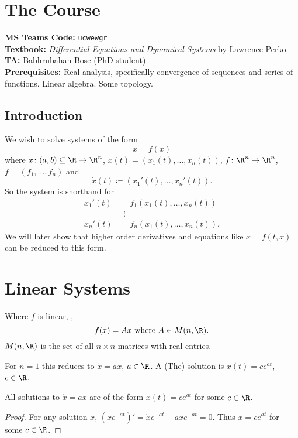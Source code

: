 
\setcounter{section}{-1}
\section{The Course} \label{sec:course}
\textbf{MS Teams Code:} \texttt{ucwewgr}\\
\textbf{Textbook:} \textit{Differential Equations and Dynamical Systems}
by Lawrence Perko.\\
\textbf{TA:} Babhrubahan Bose (PhD student)\\
\textbf{Prerequisites:} Real analysis, specifically convergence of sequences and
series of functions.
Linear algebra.
Some topology.

\subsection{Introduction} \label{sec:introduction}
We wish to solve systems of the form \[
    \dot{x} = f(x)
\] where $x \colon (a, b) \subseteq \R \to \R^n$, $x(t) = (x_1(t), \dots, x_n(t))$,
$f \colon \R^n \to \R^n$, $f = (f_1, \dots, f_n)$ and \[
    \dot{x}(t) \coloneq (x_1'(t), \dots, x_n'(t)).
\] So the system is shorthand for \begin{align*}
    x_1'(t) &= f_1(x_1(t), \dots, x_n(t)) \\
    &\;\;\vdots \\
    x_n'(t) &= f_n(x_1(t), \dots, x_n(t)).
\end{align*}
We will later show that higher order derivatives and equations like
$\dot{x} = f(t, x)$ can be reduced to this form.

\section{Linear Systems} \label{sec:linear}
Where $f$ is linear, \ie, \[
    f(x) = Ax \text{ where } A \in M(n, \R).
\] $M(n, \R)$ is the set of all $n \times n$ matrices with real entries.

For $n = 1$ this reduces to $\dot{x} = ax$, $a \in \R$.
A (The) solution is $x(t) = ce^{at}$, $c \in \R$.

\begin{theorem}[Uniqueness] \label{thm:linear:uniqueness}
    All solutions to $\dot{x} = ax$ are of the form $x(t) = ce^{at}$ for some
    $c \in \R$.
\end{theorem}
\begin{proof}
    For any solution $x$, $(x e^{-at})' = \dot{x} e^{-at} - a x e^{-at} = 0$.
    Thus $x = c e^{at}$ for some $c \in \R$.
\end{proof}

